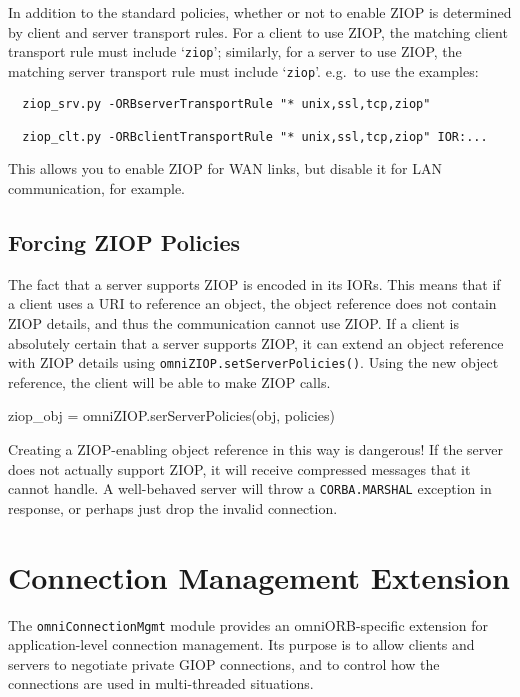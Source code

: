 \documentclass[11pt,oneside,a4paper]{book}
\newcommand{\code}[1]{\texttt{#1}}
\newcommand{\op}[1]{\texttt{#1()}}
\begin{document}
\noindent In addition to the standard policies, whether or not to
enable ZIOP is determined by client and server transport rules. For a
client to use ZIOP, the matching client transport rule must include
`\code{ziop}'; similarly, for a server to use ZIOP, the matching
server transport rule must include `\code{ziop}'. e.g.\ to use the
examples:

\begin{verbatim}
  ziop_srv.py -ORBserverTransportRule "* unix,ssl,tcp,ziop"

  ziop_clt.py -ORBclientTransportRule "* unix,ssl,tcp,ziop" IOR:...
\end{verbatim}

\noindent This allows you to enable ZIOP for WAN links, but disable it
for LAN communication, for example.


\subsection{Forcing ZIOP Policies}

The fact that a server supports ZIOP is encoded in its IORs. This
means that if a client uses a  URI to reference an
object, the object reference does not contain ZIOP details, and thus
the communication cannot use ZIOP. If a client is absolutely certain
that a server supports ZIOP, it can extend an object reference with
ZIOP details using \op{omniZIOP.setServerPolicies}. Using the new
object reference, the client will be able to make ZIOP calls.

\begin{pylisting}
ziop_obj = omniZIOP.serServerPolicies(obj, policies)
\end{pylisting}

Creating a ZIOP-enabling object reference in this way is dangerous!
If the server does not actually support ZIOP, it will receive
compressed messages that it cannot handle. A well-behaved server will
throw a \code{CORBA.MARSHAL} exception in response, or perhaps just
drop the invalid connection.



\section{Connection Management Extension}

The \code{omniConnectionMgmt} module provides an omniORB-specific
extension for application-level connection management. Its purpose is
to allow clients and servers to negotiate private GIOP connections,
and to control how the connections are used in multi-threaded
situations.
\end{document}
